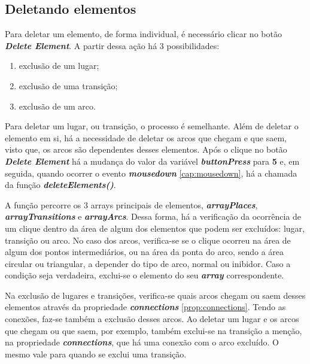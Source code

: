 \documentclass[
	12pt,				%
	openright,			%
	oneside,			%
	a4paper,			%
	english,			%
	brazil				%
	]{abntex2}
\begin{document}
\subsection*{Deletando elementos}

Para deletar um elemento, de forma individual, é necessário clicar no botão \textbf{\textit{Delete Element}}. A partir dessa ação há 3 possibilidades: 

\begin{enumerate}
	\item exclusão de um lugar;
	\item exclusão de uma transição;
	\item exclusão de um arco.
\end{enumerate}

Para deletar um lugar, ou transição, o processo é semelhante. Além de deletar o elemento em si, há a necessidade de deletar os arcos que chegam e que saem, visto que, os arcos são dependentes desses elementos. Após o clique no botão \textbf{\textit{Delete Element}} há a mudança do valor da variável \textbf{\textit{buttonPress}} para \textbf{5} e, em seguida, quando ocorrer o evento \textbf{\textit{mousedown}} \ref{cap:mousedown}, há a chamada da função \textbf{\textit{deleteElements()}}. 

A função percorre os 3 arrays principais de elementos, \textbf{\textit{arrayPlaces}}, \textbf{\textit{arrayTransitions}} e \textbf{\textit{arrayArcs}}. Dessa forma, há a verificação da ocorrência de um clique dentro da área de algum dos elementos que podem ser excluídos: lugar, transição ou arco. No caso dos arcos, verifica-se se o clique ocorreu na área de algum dos pontos intermediários, ou na área da ponta do arco, sendo a área circular ou triangular, a depender do tipo de arco, normal ou inibidor. Caso a condição seja verdadeira, exclui-se o elemento do seu \textbf{\textit{array}} correspondente.



Na exclusão de lugares e transições, verifica-se quais arcos chegam ou saem desses elementos através da propriedade \textbf{\textit{connections}} \ref{prop:connections}. Tendo as conexões, faz-se também a exclusão desses arcos. Ao deletar um lugar e os arcos que chegam ou que saem, por exemplo, também exclui-se na transição a menção, na propriedade \textbf{\textit{connections}}, que há uma conexão com o arco excluído. O mesmo vale para quando se exclui uma transição. 
\end{document}
